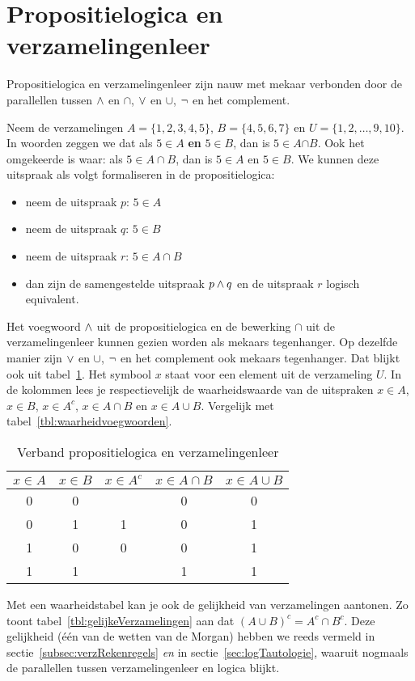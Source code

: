 \section{Propositielogica en verzamelingenleer}
Propositielogica en verzamelingenleer zijn nauw met mekaar verbonden door de parallellen tussen $\wedge$ en $\cap$, $\vee$ en $\cup$, $\neg$ en het complement.

Neem de verzamelingen $A=\{1,2,3,4,5\}$, $B=\{4,5,6,7\}$ en $U=\{1,2,\dots,9,10\}$. 
In woorden zeggen we dat  als $5\in A$ \textbf{en} $5\in B$, dan is $5\in A\pmb{\pmb{\cap}} B$. Ook het omgekeerde is waar: als $5\in A\cap B$, dan is $5\in A$ en $5\in B$. We kunnen deze uitspraak  als volgt formaliseren in de propositielogica:
\begin{itemize}
\item neem de uitspraak $p$: $5\in A$
\item neem de uitspraak $q$: $5\in B$
\item neem de uitspraak $r$: $5\in A\cap B$
\item dan zijn de samengestelde uitspraak $p\wedge q$ en de uitspraak $r$ logisch equivalent.
\end{itemize}
Het voegwoord $\wedge$ uit de propositielogica en de bewerking $\cap$ uit de verzamelingenleer kunnen gezien worden als mekaars tegenhanger. Op dezelfde manier zijn $\vee$ en $\cup$, $\neg$ en het complement ook mekaars tegenhanger. Dat blijkt ook uit tabel~\ref{tbl:waarheidstabelVerzamelingen}. Het symbool $x$ staat voor een element uit de verzameling $U$. In de kolommen lees je respectievelijk de waarheidswaarde van de uitspraken $x\in A$, $x\in B$, $x\in A^c$, $x\in A\cap B$ en $x\in A\cup B$. Vergelijk met tabel~\ref{tbl:waarheidvoegwoorden}.

\begin{table}[htb]
  \centering
  \caption{Verband propositielogica en verzamelingenleer}\label{tbl:waarheidstabelVerzamelingen}
\begin{tabular}{ccccc}
\toprule
 $x\in A$  & $x\in B$ & $x\in A^c$ & $x\in A\cap B$ & $x\in A\cup B$  \\
\midrule
  0 & 0 & & 0 & 0 \\
  0 & 1 & 1 & 0 & 1 \\
  1 & 0 & 0 & 0 & 1 \\
  1 & 1 &  & 1 & 1 \\
\bottomrule
\end{tabular}
\end{table}

Met een waarheidstabel kan je ook de gelijkheid van verzamelingen aantonen. Zo toont tabel~\ref{tbl:gelijkeVerzamelingen} aan dat $(A\cup B)^c=A^c\cap B^c$. Deze gelijkheid (één van de wetten van de Morgan) hebben we reeds vermeld in sectie~\ref{subsec:verzRekenregels} \emph{en} in sectie~\ref{sec:logTautologie}, waaruit nogmaals de parallellen tussen verzamelingenleer en logica blijkt. 


